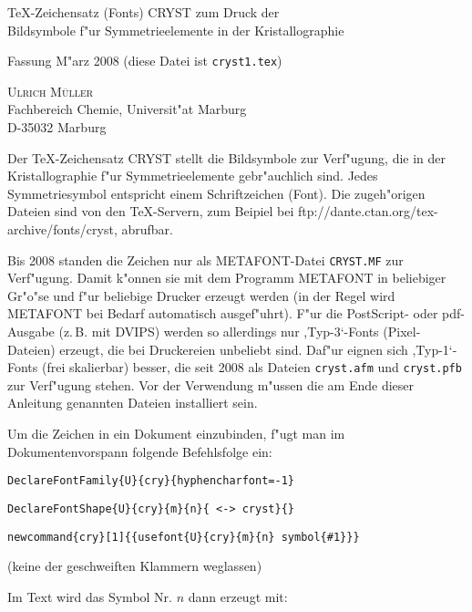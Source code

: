 \documentclass{article}
\begin{document}
\vspace*{6pt}
\begin{center}
{\Large  \TeX -Zeichensatz (Fonts) CRYST zum Druck der\\[3pt] Bildsymbole f"ur
 Symmetrieelemente in der Kristallographie}

\vskip9pt Fassung M"arz 2008 (diese Datei ist \texttt{cryst1.tex})

\vskip9pt
\textsc{Ulrich M\"uller}\\
Fachbereich Chemie, Universit"at Marburg\\
D-35032 Marburg
\end{center}

\vskip12pt
\noindent Der \TeX -Zeichensatz \textsf{\small CRYST} stellt die Bildsymbole zur Verf"ugung,
die in der Kristallographie f"ur Symmetrieelemente gebr"auchlich sind.
Jedes Symmetriesymbol entspricht einem Schriftzeichen (Font).
Die zugeh"origen Dateien sind von den \TeX -Servern, zum Beipiel bei \textsf{ftp://dante.ctan.org/tex-archive/fonts/cryst}, 
abrufbar.

Bis 2008 standen die Zeichen nur als \textsf{\small METAFONT}-Datei \texttt{CRYST.MF} zur Verf"ugung.
Damit k"onnen sie mit dem Programm \textsf{\small METAFONT} in beliebiger Gr"o"se und f"ur
beliebige Drucker erzeugt werden (in der Regel wird \textsf{\small METAFONT} bei Bedarf automatisch
ausgef"uhrt). F"ur die PostScript- oder pdf-Ausgabe (z.\,B. mit \textsf{\small DVIPS})
werden so allerdings nur ,Typ-3`-Fonts (Pixel-Dateien) erzeugt, die bei Druckereien unbeliebt sind.
Daf"ur eignen sich ,Typ-1`-Fonts (frei skalierbar) besser, die seit 2008 als Dateien  \texttt{cryst.afm} und \texttt{cryst.pfb}
zur Verf"ugung stehen. 
Vor der Verwendung m"ussen die
am Ende dieser Anleitung genannten Dateien installiert sein.

Um die Zeichen in ein Dokument einzubinden, f"ugt man im Dokumentenvorspann folgende Befehlsfolge ein: 

\vskip6pt
\texttt{DeclareFontFamily\{U\}\{cry\}\{hyphencharfont=-1\}}

\texttt{DeclareFontShape\{U\}\{cry\}\{m\}\{n\}\{ <-> cryst\}\{\}} 

\texttt{newcommand\{cry\}[1]\{\{usefont\{U\}\{cry\}\{m\}\{n\}\ symbol\{\#1\}\}\}}

(keine der geschweiften Klammern weglassen) 

\vskip6pt
Im Text wird das Symbol  Nr. $n$  dann erzeugt mit:
\end{document}
